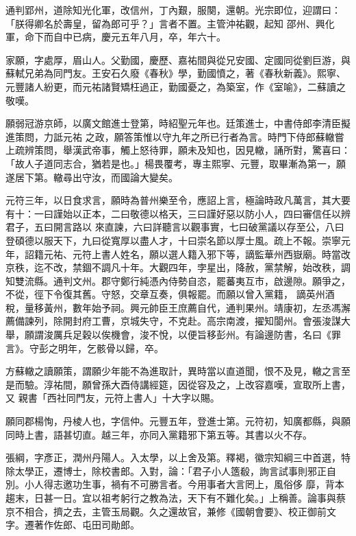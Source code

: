 \begin{pinyinscope}
 通判郢州，道除知光化軍，改信州，丁內艱，服闋，還朝。光宗即位，迎謂曰：「朕得卿名於壽皇，留為郎可乎？」言者不置。主管沖祐觀，起知
 邵州、興化軍，命下而自中已病，慶元五年八月，卒，年六十。



 家願，字處厚，眉山人。父勤國，慶歷、嘉祐間與從兄安國、定國同從劉巨游，與蘇軾兄弟為同門友。王安石久廢《春秋》學，勤國憤之，著《春秋新義》。熙寧、元豐諸人紛更，而元祐諸賢矯枉過正，勤國憂之，為築室，作《室喻》，二蘇讀之敬嘆。



 願弱冠游京師，以廣文館進士登第，時紹聖元年也。廷策進士，中書侍郎李清臣擬進策問，力詆元祐
 之政，願答策惟以守九年之所已行者為言。時門下侍郎蘇轍嘗上疏辨策問，舉漢武帝事，觸上怒待罪，願未及知也，因見轍，誦所對，驚喜曰：「故人子道同志合，猶若是也。」楊畏覆考，專主熙寧、元豐，取畢漸為第一，願遂居下第。轍尋出守汝，而國論大變矣。



 元符三年，以日食求言，願時為普州樂至令，應詔上言，極論時政凡萬言，其大要有十：一曰謹始以正本，二曰敬德以格天，三曰謹好惡以防小人，四曰審信任以辨君子，五曰開言路以
 來直諫，六曰詳聽言以觀事實，七曰破黨議以存至公，八曰登碩德以服天下，九曰從寬厚以盡人才，十曰崇名節以厚士風。疏上不報。崇寧元年，詔籍元祐、元符上書人姓名，願以選人籍入邪下等，謫監華州西嶽廟。時當改京秩，迄不改，禁錮不調凡十年。大觀四年，孛星出，降赦，黨禁解，始改秩，調知雙流縣。通判文州。郡守鄭行純憑內侍勢自恣，罷蕃夷互市，啟邊隙。願爭之，不從，徑下令復其舊。守怒，交章互奏，俱報罷。而願以曾入黨籍，
 謫英州酒稅，量移黃州，數年始予祠。興元帥臣王庶薦自代，通判果州。靖康初，左丞馮澥薦備諫列，除開封府工曹，京城失守，不克赴。高宗南渡，擢知閬州。會張浚謀大舉，願謂浚厲兵足穀以俟機會，浚不悅，以便旨移彭州。有論邊防書，名曰《罪言》。守彭之明年，乞骸骨以歸，卒。



 方蘇轍之讀願策，謂願少年能不為進取計，異時當以直道聞，恨不及見，轍之言至是而驗。淳祐間，願曾孫大酉侍講經筵，因從容及之，上改容嘉嘆，宣取所上書，又
 親書「西社同門友，元符上書人」十大字以賜。



 願同郡楊恂，丹棱人也，字信仲。元豐五年，登進士第。元符初，知廣都縣，與願同時上書，語甚切直。越三年，亦同入黨籍邪下第五等。其書以火不存。



 張綱，字彥正，潤州丹陽人。入太學，以上舍及第。釋褐，徽宗知綱三中首選，特除太學正，遷博士，除校書郎。入對，論：「君子小人簉殽，詢言試事則邪正自別。小人得志邀功生事，禍有不可勝言者。今用事者大言罔上，風俗侈
 靡，背本趨末，日甚一日。宜以祖考躬行之教為法，天下有不難化矣。」上稱善。論事與蔡京不相合，擠之去，主管玉局觀。久之還故官，兼修《國朝會要》、校正御前文字。遷著作佐郎、屯田司勛郎。




\end{pinyinscope}
